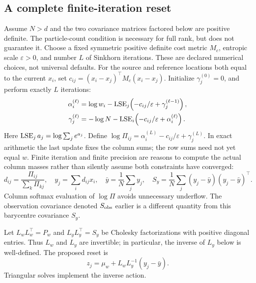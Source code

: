 \subsection{A complete finite-iteration reset}

Assume \(N>d\) and the two covariance matrices factored below are positive
definite. The particle-count condition is necessary for full rank, but does
not guarantee it. Choose a fixed symmetric positive definite cost metric
\(M_c\), entropic scale \(\varepsilon>0\), and number \(L\) of Sinkhorn
iterations. These are declared numerical choices, not universal defaults.
For the source and reference locations both equal to the current \(x_i\), set
\(c_{ij}=(x_i-x_j)^\top M_c(x_i-x_j)\).
Initialize \(\gamma_j^{(0)}=0\), and perform exactly \(L\) iterations:
\begin{align}
\label{eq:bf-covariance-proposal-sinkhorn-iterations}
 \alpha_i^{(\ell)}
  &=\log w_i-\operatorname{LSE}_j\!\left(-c_{ij}/\varepsilon+
                                 \gamma_j^{(\ell-1)}\right),\\
 \gamma_j^{(\ell)}
  &=-\log N-\operatorname{LSE}_i\!\left(-c_{ij}/\varepsilon+
                                 \alpha_i^{(\ell)}\right).
 \nonumber
\end{align}
Here \(\operatorname{LSE}_j a_j=\log\sum_j e^{a_j}\). Define
\(\log\Pi_{ij}=\alpha_i^{(L)}-c_{ij}/\varepsilon+\gamma_j^{(L)}\).
In exact arithmetic the last update fixes the column sums; the row sums
need not yet equal \(w\). Finite iteration and finite precision are reasons
to compute the actual column masses rather than silently assume both
constraints have converged:
\begin{equation}
\label{eq:bf-covariance-proposal-actual-barycentres}
 d_{ij}=\frac{\Pi_{ij}}{\sum_k\Pi_{kj}},\quad
 y_j=\sum_i d_{ij}x_i,\quad
 \bar y=\frac1N\sum_j y_j,\quad
 S_y=\frac1N\sum_j(y_j-\bar y)(y_j-\bar y)^\top .
\end{equation}
Column softmax evaluation of \(\log\Pi\) avoids unnecessary underflow.
The observation covariance denoted \(S_{\rm obs}\) earlier is a different
quantity from this barycentre covariance \(S_y\).

Let \(L_wL_w^\top=P_w\) and \(L_yL_y^\top=S_y\) be Cholesky factorizations
with positive diagonal entries. Thus \(L_w\) and \(L_y\) are invertible;
in particular, the inverse of \(L_y\) below is well-defined.
The proposed reset is
\begin{equation}
\label{eq:bf-covariance-proposal-cholesky-reset}
 z_j=\mu_w+L_wL_y^{-1}(y_j-\bar y).
\end{equation}
Triangular solves implement the inverse action.

